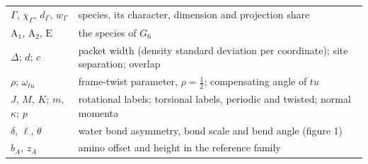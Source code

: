 \documentclass[12pt]{article}
\begin{document}
{\begin{longtable}{@{}>{\raggedright\arraybackslash}p{5.9cm}>{\raggedright\arraybackslash}p{8.4cm}@{}}
$\Gamma$, $\chi_\Gamma$, $d_\Gamma$, $w_\Gamma$ & species, its character, dimension and projection share\\
$\mathrm A_1$, $\mathrm A_2$, $\mathrm E$ & the species of $G_6$\\
$\Delta$; $d$; $c$ & packet width (density standard deviation per coordinate); site separation; overlap\\
$\rho$; $\omega_{tu}$ & frame-twist parameter, $\rho=\tfrac12$; compensating angle of $tu$\\
$J$, $M$, $K$; $m$, $\kappa$; $p$ & rotational labels; torsional labels, periodic and twisted; normal momenta\\
$\delta$, $\ell$, $\theta$ & water bond asymmetry, bond scale and bend angle (figure 1)\\
$b_A$, $z_A$ & amino offset and height in the reference family\\
\hline
\end{longtable}}

\clearpage


\end{document}
